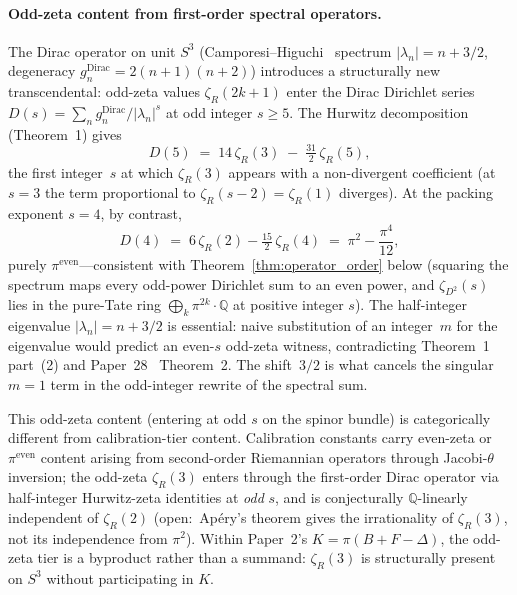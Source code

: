 \documentclass[aps,pra,twocolumn,superscriptaddress,longbibliography]{revtex4-2}
\begin{document}
\paragraph{Odd-zeta content from first-order spectral operators.}
The Dirac operator on unit $S^3$ (Camporesi--Higuchi~\cite{camporesi_higuchi1996}
spectrum $|\lambda_n| = n + 3/2$, degeneracy
$g_n^{\text{Dirac}} = 2(n+1)(n+2)$) introduces a structurally new
transcendental: odd-zeta values $\zeta_R(2k{+}1)$ enter the Dirac
Dirichlet series $D(s) = \sum_n g_n^{\text{Dirac}}/|\lambda_n|^s$ at
odd integer $s \ge 5$.  The Hurwitz decomposition (Theorem~1) gives
\begin{equation}\label{eq:dirac_zeta3_witness}
  D(5) \;=\; 14\,\zeta_R(3) \;-\; \tfrac{31}{2}\,\zeta_R(5),
\end{equation}
the first integer~$s$ at which $\zeta_R(3)$ appears with a non-divergent
coefficient (at $s = 3$ the term proportional to $\zeta_R(s{-}2) = \zeta_R(1)$
diverges).  At the packing exponent $s = 4$, by contrast,
\begin{equation}\label{eq:dirac_d4_value}
  D(4) \;=\; 6\,\zeta_R(2) - \tfrac{15}{2}\,\zeta_R(4)
        \;=\; \pi^2 - \frac{\pi^4}{12},
\end{equation}
purely $\pi^{\text{even}}$---consistent with Theorem~\ref{thm:operator_order}
below (squaring the spectrum maps every odd-power Dirichlet sum to an
even power, and $\zeta_{D^2}(s)$ lies in the pure-Tate ring
$\bigoplus_k \pi^{2k}\cdot\mathbb{Q}$ at positive integer $s$).  The half-integer eigenvalue $|\lambda_n| = n + 3/2$
is essential: naive substitution of an integer~$m$ for the eigenvalue
would predict an even-$s$ odd-zeta witness, contradicting Theorem~1
part~(2) and Paper~28~\cite{loutey_paper28} Theorem~2.
The shift~$3/2$ is what cancels the singular $m=1$ term in the
odd-integer rewrite of the spectral sum.

This odd-zeta content (entering at odd $s$ on the spinor bundle) is
categorically different from calibration-tier content.  Calibration
constants carry even-zeta or $\pi^{\text{even}}$ content arising from
second-order Riemannian operators through Jacobi-$\theta$ inversion;
the odd-zeta $\zeta_R(3)$ enters through the first-order Dirac operator
via half-integer Hurwitz-zeta identities at \emph{odd} $s$, and is
conjecturally $\mathbb{Q}$-linearly independent of $\zeta_R(2)$ (open:\
Ap\'ery's theorem gives the irrationality of $\zeta_R(3)$, not its
independence from $\pi^2$).  Within Paper~2's $K = \pi(B + F - \Delta)$, the odd-zeta tier
is a byproduct rather than a summand: $\zeta_R(3)$ is structurally
present on $S^3$ without participating in $K$.
\end{document}

